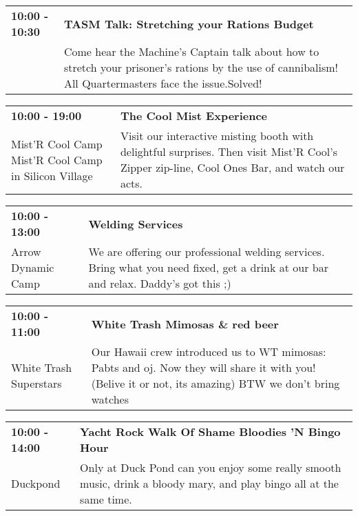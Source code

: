 \begin{tabular}{ p{1in} p{2.2in} }
    \textbf{10:00 - 10:30} & \textbf{TASM Talk: Stretching your Rations Budget} \\
    ~ \newline  & Come hear the Machine's Captain talk about how to stretch your prisoner's rations by the use of cannibalism! All Quartermasters face the issue.Solved! \\
    \hline 
\end{tabular}
    
\begin{tabular}{ p{1in} p{2.2in} }
    \textbf{10:00 - 19:00} & \textbf{The Cool Mist Experience} \\
    Mist'R Cool Camp \newline Mist'R Cool Camp in Silicon Village & Visit our interactive misting booth with delightful surprises. Then visit Mist'R Cool's Zipper zip-line, Cool Ones Bar, and watch our acts. \\
    \hline 
\end{tabular}
    
\begin{tabular}{ p{1in} p{2.2in} }
    \textbf{10:00 - 13:00} & \textbf{Welding Services} \\
    Arrow Dynamic Camp \newline  & We are offering our professional welding services.  Bring what you need fixed, get a drink at our bar and relax. Daddy's got this ;) \\
    \hline 
\end{tabular}
    
\begin{tabular}{ p{1in} p{2.2in} }
    \textbf{10:00 - 11:00} & \textbf{White Trash Mimosas \& red beer} \\
    White Trash Superstars \newline  & Our Hawaii crew introduced us to WT mimosas: Pabts and oj. Now they will share it with you! (Belive it or not, its amazing) BTW we don't bring watches \\
    \hline 
\end{tabular}
    
\begin{tabular}{ p{1in} p{2.2in} }
    \textbf{10:00 - 14:00} & \textbf{Yacht Rock Walk Of Shame Bloodies 'N Bingo Hour} \\
    Duckpond \newline  & Only at Duck Pond can you enjoy some really smooth music, drink a bloody mary, and play bingo all at the same time. \\
    \hline 
\end{tabular}
    
